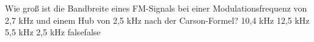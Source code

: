     {Wie groß ist die Bandbreite eines FM-Signals bei einer Modulationsfrequenz von 2,7 kHz und einem Hub von 2,5 kHz nach der Carson-Formel?}
    {10,4 kHz}
    {12,5 kHz}
    {5,5 kHz}
    {2,5 kHz}
    {false}{false}